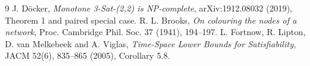 \documentclass[11pt]{article}
\begin{document}
\begin{thebibliography}{9}
 J. D\"ocker,
\emph{Monotone 3-Sat-(2,2) is
NP-complete}, arXiv:1912.08032
(2019), Theorem 1 and
paired special case.
 R. L. Brooks,
\emph{On colouring the nodes
of a network}, Proc. Cambridge
Phil. Soc. 37 (1941), 194--197.
 L. Fortnow,
R. Lipton, D. van Melkebeek
and A. Viglas,
\emph{Time-Space Lower Bounds
for Satisfiability},
JACM 52(6), 835--865 (2005),
Corollary 5.8.
\end{thebibliography}
\end{document}
